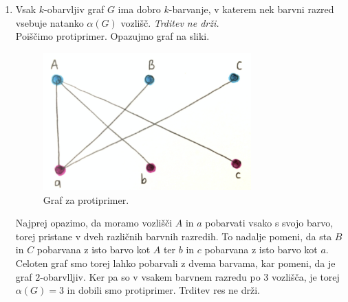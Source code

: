 \documentclass[a4paper,11pt]{article}
\begin{document}
\begin{enumerate}
    \item Vsak $k$-obarvljiv graf $G$ ima dobro $k$-barvanje, v katerem nek barvni razred vsebuje natanko $\alpha(G)$ vozlišč. \textit{Trditev ne drži.}
        \\
        Poiščimo protiprimer.
        Opazujmo graf na sliki.
        \begin{figure}[ht!]
            \centering
            \includegraphics[width=80mm]{Slike/ABCabc.png}
            \caption{Graf za protiprimer.}
        \end{figure}

        \noindent
        Najprej opazimo, da moramo vozlišči $A$ in $a$ pobarvati vsako s svojo barvo, torej pristane v dveh različnih barvnih razredih.
        To nadalje pomeni, da sta $B$ in $C$ pobarvana z isto barvo kot $A$ ter $b$ in $c$ pobarvana z isto barvo kot $a$. 
        Celoten graf smo torej lahko pobarvali z dvema barvama, kar pomeni, da je graf $2$-obarvlljiv.
        Ker pa so v vsakem barvnem razredu po 3 vozlišča, je torej $\alpha(G) = 3$ in dobili smo protiprimer. Trditev res ne drži.



\end{enumerate}
\end{document}

